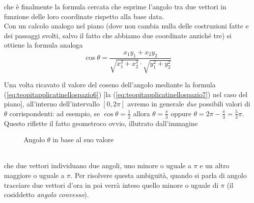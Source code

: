 che è finalmente la formula cercata che esprime l'angolo tra due vettori in funzione delle loro coordinate rispetto alla base data.\\
Con un calcolo analogo nel piano (dove non cambia nulla delle costruzioni fatte e dei passaggi svolti, salvo il fatto che abbiamo due coordinate anziché tre) si ottiene la formula analoga
\begin{equation}
  \label{eq:teopitapplicatinellospazio7}
  \cos\theta = \frac{x_1y_1+x_2y_2}{\sqrt{x^2_1+x^2_2}\cdot\sqrt{y^2_1+y^2_2}}
\end{equation}
\begin{oss}
  \label{oss:teopitapplicatinellospazio}
  Una volta ricavato il valore del coseno dell'angolo mediante la formula (\ref{eq:teopitapplicatinellospazio6}) [la (\ref{eq:teopitapplicatinellospazio7}) nel caso del piano], all'interno dell'intervallo $\left[0,2\pi\right]$ avremo in generale \textit{due} possibili valori di $\theta$ corrispondenti: ad esempio, se $\cos\theta=\frac{1}{2}$ allora $\theta=\frac{\pi}{3}$ oppure $\theta=2\pi -\frac{\pi}{3}=\frac{5}{3}\pi$. Questo riflette il fatto geometroco ovvio, illutrato dall'immagine
  \begin{figure}[ht!]
    \centering
    \resizebox{3cm}{!}{
      
    }
    \caption{Angolo $\theta$ in base al suo valore}
    \label{fig:angolotheta}
  \end{figure}\\
  che due vettori individuano due angoli, uno minore o uguale a $\pi$ e un altro maggiore o uguale a $\pi$. Per risolvere questa ambiguità, quando si parla di angolo tracciare due vettori d'ora in poi verrà inteso quello minore o uguale di $\pi$ (il cosiddetto \textit{angolo convesso}).
\end{oss}
